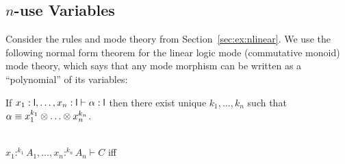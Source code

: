 \subsection{$n$-use Variables}


Consider the rules and mode theory from Section~\ref{sec:ex:nlinear}.
We use the following normal form theorem for the linear logic mode
(commutative monoid) mode theory, which says that any mode morphism can
be written as a ``polynomial'' of its variables:

\begin{lemma} \label{lem:monoid-normal} 
If $x_1 : \mathsf{l},\ldots,x_n : \mathsf{l} \vdash \alpha : \mathsf{l}$ then
there exist unique ${k_1,\ldots,k_n}$ such that $\alpha \equiv x_1^{k_1}
\otimes \ldots \otimes x_n^{k_n}$.
\end{lemma}

\begin{theorem} ~\\
$x_1:^{k_1} A_1,\ldots,x_n :^{k_n} A_n \vdash C$ iff
\end{theorem}

